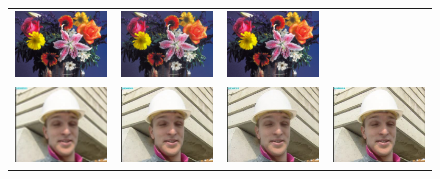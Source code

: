 \documentclass[10pt,twocolumn,letterpaper]{article}
\begin{document}
\begin{figure}[h!]
\begin{tabular}{cccc}
     	\includegraphics[width=1.5in]{images/used/appendix/jpg/Set14/flowers_SRResNet-MSE} &
     	\includegraphics[width=1.5in]{images/used/appendix/jpg/Set14/flowers_SRGAN-VGG54} &	
     	\includegraphics[width=1.5in]{images/used/appendix/jpg/Set14/flowers_HR} \\
     	\includegraphics[width=1.5in]{images/used/appendix/jpg/Set14/foreman_bicubic}&
     	\includegraphics[width=1.5in]{images/used/appendix/jpg/Set14/foreman_SRResNet-MSE} &
     	\includegraphics[width=1.5in]{images/used/appendix/jpg/Set14/foreman_SRGAN-VGG54} &
     	\includegraphics[width=1.5in]{images/used/appendix/jpg/Set14/foreman_HR} \\

\end{tabular}
\end{figure}
\end{document}

